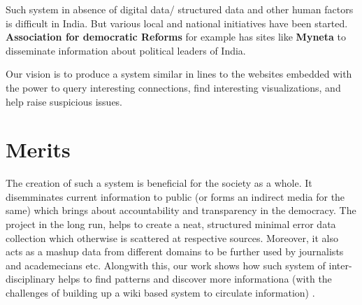 Such system in absence of digital data/ structured data and other human factors is difficult in India. But various local and national initiatives have been started. \textbf{Association for democratic Reforms} \cite{ADR} for example has sites like \textbf{Myneta} \cite{MyNeta} to disseminate information about political leaders of India.	

Our vision is to produce a system similar in lines to the websites embedded with the power to query interesting connections, find interesting visualizations, and help raise suspicious issues.

\section{Merits}

The creation of such a system is beneficial for the society as a whole. It disemminates current information to public (or forms an indirect media for the same) which brings about accountability and transparency in the democracy. The project in the long run, helps to create a neat, structured minimal error data collection which otherwise is scattered at respective sources. Moreover, it also acts as a mashup data from different domains to be further used by journalists and academecians etc. Alongwith this, our work shows how such system of inter-disciplinary helps to find patterns and discover more informationa (with the challenges of building up a wiki based system to circulate information) .

